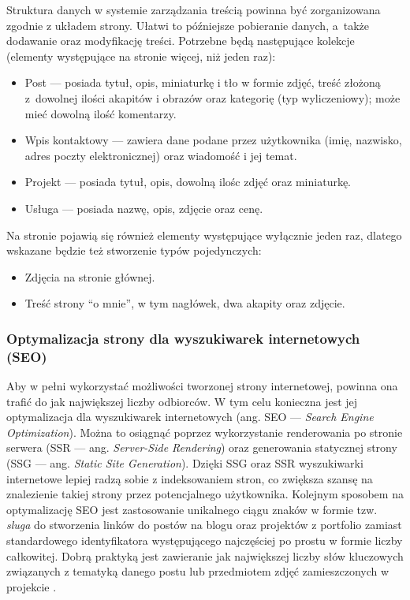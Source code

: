\documentclass[a4paper, 12pt]{article}
\numberwithin{figure}{section}
\begin{document}
\begin{sloppypar}
Struktura danych w systemie zarządzania treścią powinna być zorganizowana zgodnie z układem strony. Ułatwi to późniejsze pobieranie danych, a~także dodawanie oraz modyfikację treści. Potrzebne będą następujące kolekcje (elementy występujące na stronie więcej, niż jeden raz):
\begin{itemize}
    \item Post --- posiada tytuł, opis, miniaturkę i tło w formie zdjęć, treść złożoną z~dowolnej ilości akapitów i obrazów oraz kategorię (typ wyliczeniowy); może mieć dowolną ilość komentarzy.
    \item Wpis kontaktowy --- zawiera dane podane przez użytkownika (imię, nazwisko, adres poczty elektronicznej) oraz wiadomość i jej temat.
    \item Projekt --- posiada tytuł, opis, dowolną ilośc zdjęć oraz miniaturkę.
    \item Usługa --- posiada nazwę, opis, zdjęcie oraz cenę.
\end{itemize}
Na stronie pojawią się również elementy występujące wyłącznie jeden raz, dlatego wskazane będzie też stworzenie typów pojedynczych:
\begin{itemize}
    \item Zdjęcia na stronie głównej.
    \item Treść strony ``o mnie'', w tym nagłówek, dwa akapity oraz zdjęcie.
\end{itemize}

\subsubsection*{Optymalizacja strony dla wyszukiwarek internetowych (SEO)}

Aby w pełni wykorzystać możliwości tworzonej strony internetowej, powinna ona trafić do jak największej liczby odbiorców. W tym celu konieczna jest jej optymalizacja dla wyszukiwarek internetowych (ang. SEO --- \textit{Search Engine Optimization}). Można to osiągnąć poprzez wykorzystanie renderowania po stronie serwera (SSR --- ang. \textit{Server-Side Rendering}) oraz generowania statycznej strony (SSG --- ang. \textit{Static Site Generation}). Dzięki SSG oraz SSR wyszukiwarki internetowe lepiej radzą sobie z indeksowaniem stron, co zwiększa szansę na znalezienie takiej strony przez potencjalnego użytkownika. Kolejnym sposobem na optymalizację SEO jest zastosowanie unikalnego ciągu znaków w formie tzw. \textit{sluga} do stworzenia linków do postów na blogu oraz projektów z portfolio zamiast standardowego identyfikatora występującego najczęściej po prostu w formie liczby całkowitej. Dobrą praktyką jest zawieranie jak największej liczby słów kluczowych związanych z tematyką danego postu lub przedmiotem zdjęć zamieszczonych w projekcie \cite{seo}.


\end{sloppypar}
\end{document}
